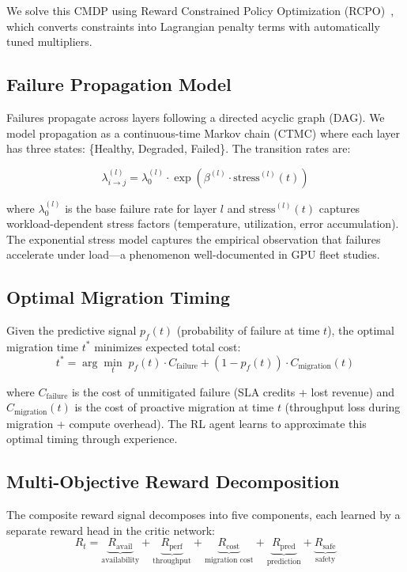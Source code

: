 \documentclass[conference,10pt,letterpaper]{IEEEtran}
\begin{document}
We solve this CMDP using Reward Constrained Policy Optimization (RCPO)~\cite{tessler2018rcpo}, which converts constraints into Lagrangian penalty terms with automatically tuned multipliers.

\subsection{Failure Propagation Model}

Failures propagate across layers following a directed acyclic graph (DAG). We model propagation as a continuous-time Markov chain (CTMC) where each layer has three states: \{Healthy, Degraded, Failed\}. The transition rates are:

\begin{equation}
\lambda_{i \to j}^{(l)} = \lambda_0^{(l)} \cdot \exp\left(\beta^{(l)} \cdot \text{stress}^{(l)}(t)\right)
\end{equation}

where $\lambda_0^{(l)}$ is the base failure rate for layer $l$ and $\text{stress}^{(l)}(t)$ captures workload-dependent stress factors (temperature, utilization, error accumulation). The exponential stress model captures the empirical observation that failures accelerate under load---a phenomenon well-documented in GPU fleet studies.

\subsection{Optimal Migration Timing}

Given the predictive signal $p_f(t)$ (probability of failure at time $t$), the optimal migration time $t^*$ minimizes expected total cost:
\begin{equation}
t^* = \arg\min_t \; p_f(t) \cdot C_{\text{failure}} + (1 - p_f(t)) \cdot C_{\text{migration}}(t)
\end{equation}

where $C_{\text{failure}}$ is the cost of unmitigated failure (SLA credits + lost revenue) and $C_{\text{migration}}(t)$ is the cost of proactive migration at time $t$ (throughput loss during migration + compute overhead). The RL agent learns to approximate this optimal timing through experience.

\subsection{Multi-Objective Reward Decomposition}

The composite reward signal decomposes into five components, each learned by a separate reward head in the critic network:
\begin{equation}
R_t = \underbrace{R_{\text{avail}}}_{\text{availability}} + \underbrace{R_{\text{perf}}}_{\text{throughput}} + \underbrace{R_{\text{cost}}}_{\text{migration cost}} + \underbrace{R_{\text{pred}}}_{\text{prediction}} + \underbrace{R_{\text{safe}}}_{\text{safety}}
\end{equation}
\end{document}
